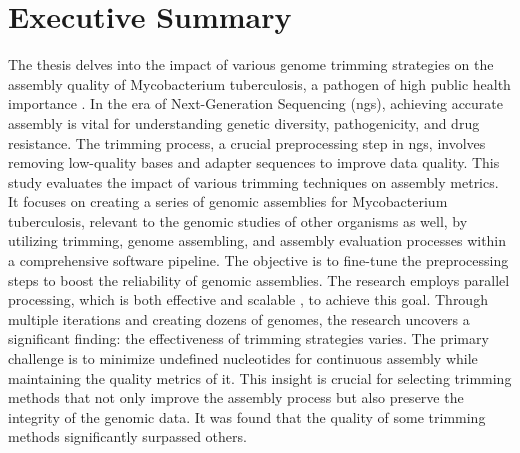 \chapter*{Executive Summary}


The thesis delves into the impact of various \gls{genome} \gls{trimming} strategies on the \gls{assembly} quality of Mycobacterium tuberculosis, a pathogen of high public health importance \cite{Kemal2018}. In the era of Next-Generation
Sequencing (\gls{ngs}), achieving accurate \gls{assembly} is vital for understanding genetic diversity, pathogenicity, and drug resistance. The trimming process, a crucial preprocessing step in \gls{ngs}, involves removing low-quality bases and adapter sequences to improve data quality. This study evaluates the impact of various trimming techniques on \gls{assembly} metrics. It focuses on creating a series of genomic assemblies for Mycobacterium tuberculosis, relevant to the genomic studies of other organisms as well, by utilizing \gls{trimming}, \gls{genome} assembling, and \gls{assembly} evaluation processes within a comprehensive software pipeline. The objective is to fine-tune the preprocessing steps to boost the reliability of genomic assemblies. The research employs parallel processing, which is both effective and scalable \cite{Vishwasrao2017}, to achieve this goal. Through multiple iterations and creating dozens of \gls{genome}s, the research uncovers a significant finding: the effectiveness of trimming strategies varies. The primary challenge is to minimize undefined nucleotides for continuous \gls{assembly} while maintaining the quality metrics of it. This insight is crucial for selecting trimming methods that not only improve the \gls{assembly} process but also preserve the integrity of the genomic data. It was found that the quality of some trimming methods significantly surpassed others.

